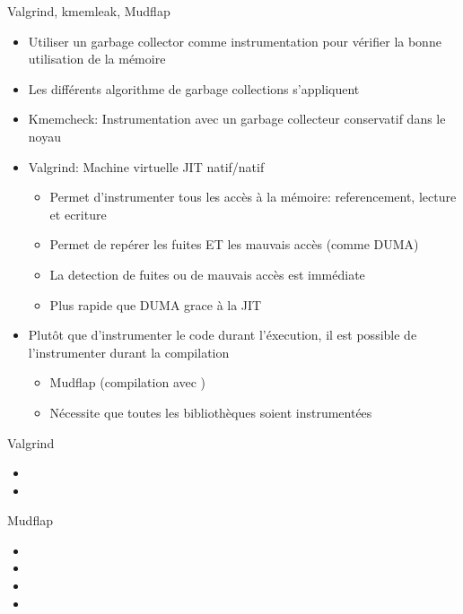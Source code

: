 \begin{frame}[fragile=singleslide]{Valgrind, kmemleak, Mudflap}
  \begin{itemize}
  \item  Utiliser  un  garbage  collector comme  instrumentation  pour
    vérifier la bonne utilisation de la mémoire
  \item Les différents algorithme de garbage collections s'appliquent
  \item   Kmemcheck:  Instrumentation   avec  un   garbage  collecteur
    conservatif dans le noyau
  \item Valgrind: Machine virtuelle JIT natif/natif
    \begin{itemize}
    \item  Permet   d'instrumenter  tous  les  accès   à  la  mémoire:
      referencement, lecture et ecriture
    \item Permet  de repérer  les fuites ET  les mauvais  accès (comme
      DUMA)
    \item La detection de fuites ou de mauvais accès est immédiate
    \item Plus rapide que DUMA grace à la JIT
    \end{itemize}
  \item Plutôt  que d'instrumenter le code durant  l'éxecution, il est
    possible de l'instrumenter durant la compilation
    \begin{itemize}
    \item Mudflap (compilation avec )
    \item Nécessite que toutes les bibliothèques soient instrumentées
    \end{itemize}
  \end{itemize}
\end{frame}

\begin{frame}[fragile=singleslide]{Valgrind}
  \begin{itemize} 
  \item {}
  \item {}
  \end{itemize}  
\end{frame}

\begin{frame}[fragile=singleslide]{Mudflap}
  \begin{itemize}
  \item {}
  \item {}
  \item {}
  \item {}
  \end{itemize}
\end{frame}

